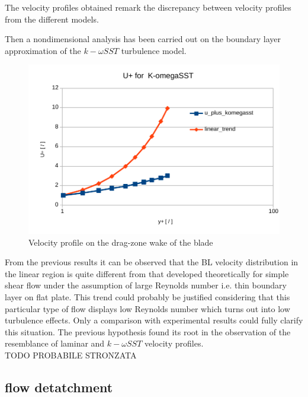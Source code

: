 \documentclass[a4paper,12pt]{article}
\newcommand{\todo}{\colorbox{cyan!60}{TODO}}
\begin{document}
The velocity profiles obtained remark the discrepancy between velocity profiles from the different models.

Then a nondimensional analysis has been carried out on the boundary layer approximation of the $k-\omega SST$ turbulence model.

\begin{figure}[H]
\centering
\includegraphics[width=14cm]{images/turbulence/kWsst_BL_sublayer.pdf} 
\caption{Velocity profile on the drag-zone wake of the blade}
\centering
\end{figure}

From the previous results it can be observed that the BL velocity distribution in the linear region is quite different from that developed theoretically for simple shear flow under the assumption of large Reynolds number i.e. thin boundary layer on flat plate.
This trend could probably be justified considering that this particular type of flow displays low Reynolds number which turns out into low turbulence effects.
Only a comparison with experimental results could fully clarify this situation.
The previous hypothesis found its root in the observation of the resemblance of laminar and $k-\omega SST$ velocity profiles.\\
\todo{} PROBABILE STRONZATA

\subsection{flow detatchment}
\end{document}
